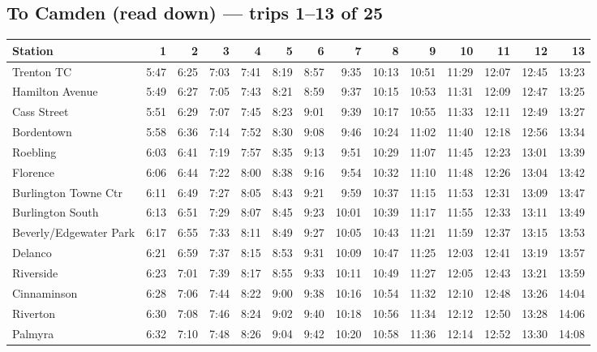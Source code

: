 \subsection*{To Camden (read down) --- trips 1--13 of 25}
\begin{center}\footnotesize\setlength{\tabcolsep}{3pt}\begin{tabular}{@{}lrrrrrrrrrrrrr@{}}\toprule
Station & 1 & 2 & 3 & 4 & 5 & 6 & 7 & 8 & 9 & 10 & 11 & 12 & 13 \\\midrule
Trenton TC & 5:47 & 6:25 & 7:03 & 7:41 & 8:19 & 8:57 & 9:35 & 10:13 & 10:51 & 11:29 & 12:07 & 12:45 & 13:23 \\
Hamilton Avenue & 5:49 & 6:27 & 7:05 & 7:43 & 8:21 & 8:59 & 9:37 & 10:15 & 10:53 & 11:31 & 12:09 & 12:47 & 13:25 \\
Cass Street & 5:51 & 6:29 & 7:07 & 7:45 & 8:23 & 9:01 & 9:39 & 10:17 & 10:55 & 11:33 & 12:11 & 12:49 & 13:27 \\
Bordentown & 5:58 & 6:36 & 7:14 & 7:52 & 8:30 & 9:08 & 9:46 & 10:24 & 11:02 & 11:40 & 12:18 & 12:56 & 13:34 \\
Roebling & 6:03 & 6:41 & 7:19 & 7:57 & 8:35 & 9:13 & 9:51 & 10:29 & 11:07 & 11:45 & 12:23 & 13:01 & 13:39 \\
Florence & 6:06 & 6:44 & 7:22 & 8:00 & 8:38 & 9:16 & 9:54 & 10:32 & 11:10 & 11:48 & 12:26 & 13:04 & 13:42 \\
Burlington Towne Ctr & 6:11 & 6:49 & 7:27 & 8:05 & 8:43 & 9:21 & 9:59 & 10:37 & 11:15 & 11:53 & 12:31 & 13:09 & 13:47 \\
Burlington South & 6:13 & 6:51 & 7:29 & 8:07 & 8:45 & 9:23 & 10:01 & 10:39 & 11:17 & 11:55 & 12:33 & 13:11 & 13:49 \\
Beverly/Edgewater Park & 6:17 & 6:55 & 7:33 & 8:11 & 8:49 & 9:27 & 10:05 & 10:43 & 11:21 & 11:59 & 12:37 & 13:15 & 13:53 \\
Delanco & 6:21 & 6:59 & 7:37 & 8:15 & 8:53 & 9:31 & 10:09 & 10:47 & 11:25 & 12:03 & 12:41 & 13:19 & 13:57 \\
Riverside & 6:23 & 7:01 & 7:39 & 8:17 & 8:55 & 9:33 & 10:11 & 10:49 & 11:27 & 12:05 & 12:43 & 13:21 & 13:59 \\
Cinnaminson & 6:28 & 7:06 & 7:44 & 8:22 & 9:00 & 9:38 & 10:16 & 10:54 & 11:32 & 12:10 & 12:48 & 13:26 & 14:04 \\
Riverton & 6:30 & 7:08 & 7:46 & 8:24 & 9:02 & 9:40 & 10:18 & 10:56 & 11:34 & 12:12 & 12:50 & 13:28 & 14:06 \\
Palmyra & 6:32 & 7:10 & 7:48 & 8:26 & 9:04 & 9:42 & 10:20 & 10:58 & 11:36 & 12:14 & 12:52 & 13:30 & 14:08 \\

\end{tabular}
\end{center}
